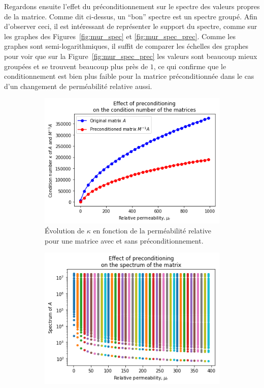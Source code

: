 \documentclass[11pt]{article}
\begin{document}
Regardons ensuite l'effet du préconditionnement sur le spectre des valeurs propres de la matrice. Comme dit ci-dessus, un \foreignquote{french}{bon} spectre est un spectre groupé. Afin d'observer ceci, il est intéressant de représenter le support du spectre, comme sur les graphes des Figures~\ref{fig:mur_spec} et \ref{fig:mur_spec_prec}. Comme les graphes sont semi-logarithmiques, il suffit de comparer les échelles des graphes pour voir que sur la Figure~\ref{fig:mur_spec_prec} les valeurs sont beaucoup mieux groupées et se trouvent beaucoup plus près de $1$, ce qui confirme que le conditionnement est bien plus faible pour la matrice préconditionnée dans le cas d'un changement de perméabilité relative aussi.

\begin{figure}[H]
	\centering
	\begin{subfigure}[t]{0.32\textwidth}
		\centering
		\includegraphics[width=\linewidth]{mur_cond.png}
		\caption{Évolution de $\kappa$ en fonction de la perméabilité relative pour une matrice avec et sans préconditionnement.}
		\label{fig:mur_cond}
	\end{subfigure}\hfill
	\begin{subfigure}[t]{0.32\textwidth}
		\centering
		\includegraphics[width=\linewidth]{mur_spec.png}

\end{subfigure}
\end{figure}
\end{document}
